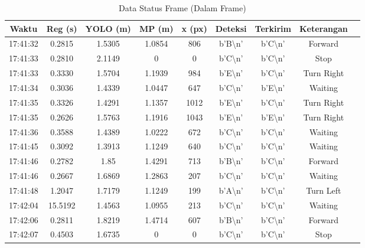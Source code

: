 \begin{table}[H]
    \centering
    \caption{Data Status Frame (Dalam Frame)}
    \label{tab:status_dalam_frame}
    \begin{tabular}{|c|c|c|c|c|c|c|c|c|}
    \hline
    Waktu & Reg (s) & YOLO (m) & MP (m) & x (px) & Deteksi & Terkirim & Keterangan \\ \hline
    17:41:32 & 0.2815 & 1.5305 & 1.0854 & 806 & b'B\textbackslash n' & b'C\textbackslash n' & Forward \\ \hline
    17:41:33 & 0.2810 & 2.1149 & 0 & 0 & b'C\textbackslash n' & b'C\textbackslash n' & Stop \\ \hline
    17:41:33 & 0.3330 & 1.5704 & 1.1939 & 984 & b'E\textbackslash n' & b'C\textbackslash n' & Turn Right \\ \hline
    17:41:34 & 0.3036 & 1.4339 & 1.0447 & 647 & b'C\textbackslash n' & b'E\textbackslash n' & Waiting \\ \hline
    17:41:35 & 0.3326 & 1.4291 & 1.1357 & 1012 & b'E\textbackslash n' & b'C\textbackslash n' & Turn Right \\ \hline
    17:41:35 & 0.2626 & 1.5763 & 1.1916 & 1043 & b'E\textbackslash n' & b'E\textbackslash n' & Turn Right \\ \hline
    17:41:36 & 0.3588 & 1.4389 & 1.0222 & 672 & b'C\textbackslash n' & b'C\textbackslash n' & Waiting \\ \hline
    17:41:45 & 0.3092 & 1.3913 & 1.1249 & 640 & b'C\textbackslash n' & b'C\textbackslash n' & Waiting \\ \hline
    17:41:46 & 0.2782 & 1.85 & 1.4291 & 713 & b'B\textbackslash n' & b'C\textbackslash n' & Forward \\ \hline
    17:41:46 & 0.2667 & 1.6869 & 1.2863 & 207 & b'C\textbackslash n' & b'C\textbackslash n' & Waiting \\ \hline
    17:41:48 & 1.2047 & 1.7179 & 1.1249 & 199 & b'A\textbackslash n' & b'C\textbackslash n' & Turn Left \\ \hline
    17:42:04 & 15.5192 & 1.4563 & 1.0955 & 213 & b'C\textbackslash n' & b'C\textbackslash n' & Waiting \\ \hline
    17:42:06 & 0.2811 & 1.8219 & 1.4714 & 607 & b'B\textbackslash n' & b'C\textbackslash n' & Forward \\ \hline
    17:42:07 & 0.4503 & 1.6735 & 0 & 0 & b'C\textbackslash n' & b'C\textbackslash n' & Stop \\ \hline
    \end{tabular}
\end{table}

